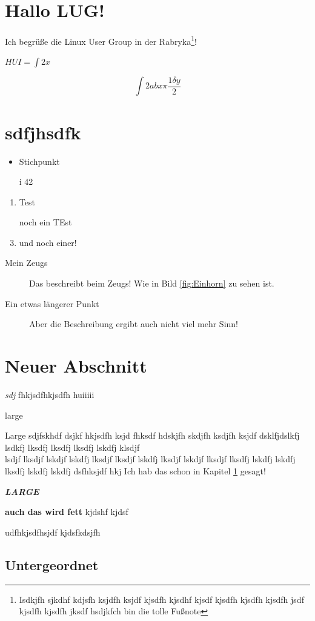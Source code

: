 \documentclass[a4paper, 11pt, twoside]{article}
\begin{document}
\section{Hallo LUG!}
\label{lug}
Ich begrüße die Linux User Group in der Rabryka\footnote{Isdkjfh sjkdhf kdjsfh ksjdfh ksjdf kjsdfh kjsdhf kjsdf kjsdfh kjsdfh kjsdfh jsdf kjsdfh kjsdfh jksdf hsdjkfch bin die tolle Fußnote}!


$HUI = \int 2x$

\[ \int 2abx \pi \frac{1 \delta y}{2}\]

\section{sdfjhsdfk}

\begin{itemize}
\item Stichpunkt
\item[i] 42
\end{itemize}

\begin{enumerate}
\item Test 
\item[] noch ein TEst
\item und noch einer!
\end{enumerate}

\begin{description}
\item[Mein Zeugs] Das beschreibt beim Zeugs! Wie in Bild \ref{fig:Einhorn} zu sehen ist.
\item[Ein etwas längerer Punkt] Aber die Beschreibung ergibt auch nicht viel mehr Sinn!
\end{description}

\section{Neuer Abschnitt}

\textit{sdj} fhkjsdfhkjsdfh \tiny huiiiii





\large
large

\Large
Large sdjfskhdf dsjkf hkjsdfh ksjd fhksdf hdskjfh skdjfh ksdjfh ksjdf   dsklfjdslkfj lsdkfj lksdfj lksdfj lksdfj lskdfj klsdjf \\ lsdjf lksdjf lskdjf lskdfj lksdjf lksdjf lskdfj lksdjf lskdjf lksdjf lksdfj lskdfj lskdfj lksdfj lskdfj lskdfj dsfhksjdf hkj Ich hab das schon in Kapitel \ref{lug} gesagt!
\newpage

\LARGE
\textit{\textbf{LARGE}}

\normalsize

 \textbf{auch das wird fett} kjdshf kjdsf 


udfhkjsdfhsjdf 
kjdsfkdsjfh 
\subsection{Untergeordnet}



\end{document}
